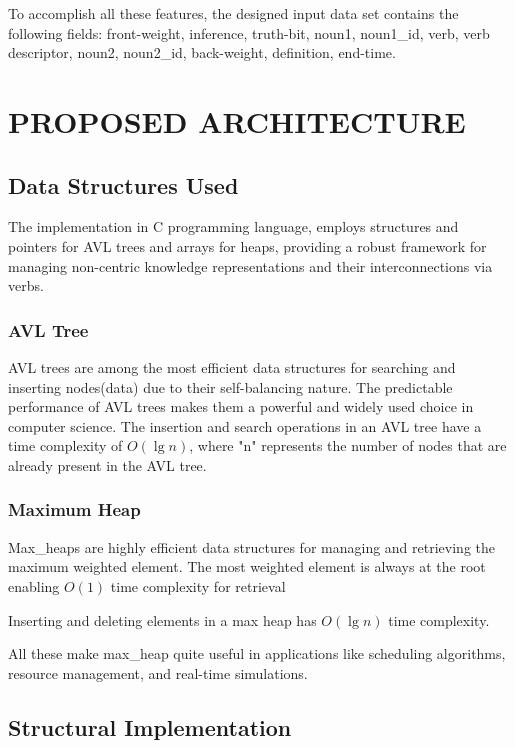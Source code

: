 \documentclass[conference]{IEEEtran}
\begin{document}
To accomplish all these features, the designed input data set contains the following fields: front-weight, inference, truth-bit, noun1, noun1\_id, verb, verb descriptor, noun2, noun2\_id, back-weight, definition, end-time.


\section{PROPOSED ARCHITECTURE}

\subsection{\textbf{Data Structures Used}}
The implementation in C programming language\cite{b9}, employs structures and pointers for AVL trees and arrays for heaps, providing a robust framework for managing non-centric knowledge representations and their interconnections via verbs.

\subsubsection{\textbf{AVL Tree}}

AVL trees are among the most efficient data structures for searching and inserting nodes(data) due to their 
self-balancing nature. The predictable performance of AVL trees makes them a powerful and widely used choice in computer science.
The insertion and search operations in an AVL tree have a time complexity of $O(\lg n)$, 
where "n" represents the number of nodes that are already present in the AVL tree.


\subsubsection{\textbf{Maximum Heap}}

Max\_heaps are highly efficient data structures for managing and retrieving the maximum weighted element. 
The most weighted element is always at the root enabling $O(1)$ time complexity for retrieval

Inserting and deleting elements in a max heap has $O(\lg n)$ time complexity.

All these make max\_heap quite useful in applications like scheduling algorithms, resource management, and real-time simulations.


\subsection{\textbf{Structural Implementation}}
\end{document}
